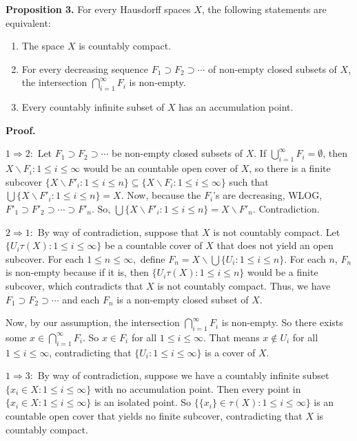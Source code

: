 \documentclass{article}
\begin{document}
\vskip 10pt



\textbf{Proposition 3.} For every Hausdorff spaces $X$, the following statements are equivalent: \vskip 5pt
\begin{enumerate}
	\item  The space $X$ is countably compact.
	\item For every decreasing sequence $F_1\supset F_2 \supset \cdots $ of non-empty closed subsets of $X$, the intersection $\bigcap_{i=1}^{\infty} F_i$ is non-empty. 
	\item Every countably infinite subset of $X$ has an accumulation point. 
\end{enumerate}
\vskip 10pt
\textbf{Proof.} \vskip 5pt

\texttt{$1\Rightarrow 2:$} Let $F_1\supset F_2 \supset \cdots $ be non-empty closed subsets of $X$. If $\bigcup_{i=1}^{\infty} F_i =\emptyset$, then $X\backslash F_i : 1\leq i \leq \infty $ would be an countable open cover of $X$, so there is a finite subcover $\{X\backslash F'_i : 1\leq i \leq n\} \subseteq \{X\backslash F_i : 1\leq i \leq \infty\}$ such that $\bigcup \{X\backslash F'_i : 1\leq i \leq n\}= X$. Now, because the $F_i$'s are decreasing, WLOG, $F'_1 \supset F'_2 \supset \cdots \supset F'_n$. So, $\bigcup \{X\backslash F'_i : 1\leq i \leq n\}= X\backslash F'_n$. Contradiction.


\vskip 5pt

\textbf{$2\Rightarrow 1:$} By way of contradiction, suppose that $X$ is not countably compact.
Let $\{U_i\tau(X): 1\leq i\leq \infty\}$ be a countable cover of $X$ that does not yield an open subcover. For each $1\leq n\leq \infty,$ define $F_n=X\backslash \bigcup\{U_i: 1\leq i\leq n\}.$ For each $n$, $F_n$ is non-empty because if it is, then $\{U_i\tau(X): 1\leq i\leq n\}$ would be a finite subcover, which contradicts that $X$ is not countably compact. Thus, we have $F_1\supset F_2 \supset \cdots $ and each $F_n$ is a non-empty closed subset of $X$. 

Now, by our assumption, the intersection $\bigcap_{i=1}^{\infty} F_i$ is non-empty. So there exists some $x\in \bigcap_{i=1}^{\infty} F_i$. So $x\in F_i$ for all $1\leq i\leq \infty$. That means $x\notin U_i$ for all $1\leq i\leq \infty$, contradicting that $\{U_i: 1\leq i\leq \infty\}$ is a cover of $X$. \vskip 5pt




\texttt{$1\Rightarrow 3:$} By way of contradiction, suppose we have a countably infinite subset $\{x_i\in X: 1\leq i \leq \infty\}$ with no accumulation point. Then every point in  $\{x_i\in X: 1\leq i \leq \infty\}$ is an isolated point. So $\{\{x_i\}\in \tau(X): 1\leq i \leq \infty\}$ is an countable open cover that yields no finite subcover, contradicting that $X$ is countably compact. \vskip 5pt
\end{document}
